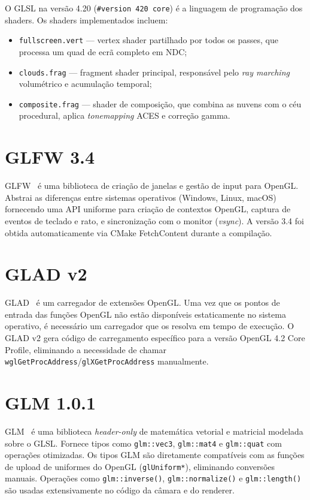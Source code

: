 O \ac{GLSL} na versão 4.20 (\texttt{\#version 420 core}) é a linguagem de programação dos shaders. Os shaders implementados incluem:

\begin{itemize}
    \item \texttt{fullscreen.vert} --- vertex shader partilhado por todos os passes, que processa um quad de ecrã completo em \ac{NDC};
    \item \texttt{clouds.frag} --- fragment shader principal, responsável pelo \emph{ray marching} volumétrico e acumulação temporal;
    \item \texttt{composite.frag} --- shader de composição, que combina as nuvens com o céu procedural, aplica \emph{tonemapping} ACES e correção gamma.
\end{itemize}

\section{GLFW 3.4}
\label{chap3:sec:glfw}

\ac{GLFW}~\cite{glfw} é uma biblioteca de criação de janelas e gestão de input para \ac{OpenGL}. Abstrai as diferenças entre sistemas operativos (Windows, Linux, macOS) fornecendo uma \ac{API} uniforme para criação de contextos OpenGL, captura de eventos de teclado e rato, e sincronização com o monitor (\emph{vsync}). A versão 3.4 foi obtida automaticamente via CMake FetchContent durante a compilação.

\section{GLAD v2}
\label{chap3:sec:glad}

\ac{GLAD}~\cite{glad} é um carregador de extensões \ac{OpenGL}. Uma vez que os pontos de entrada das funções OpenGL não estão disponíveis estaticamente no sistema operativo, é necessário um carregador que os resolva em tempo de execução. O GLAD v2 gera código de carregamento específico para a versão OpenGL 4.2 Core Profile, eliminando a necessidade de chamar \texttt{wglGetProcAddress}/\texttt{glXGetProcAddress} manualmente.

\section{GLM 1.0.1}
\label{chap3:sec:glm}

\ac{GLM}~\cite{glm} é uma biblioteca \emph{header-only} de matemática vetorial e matricial modelada sobre o \ac{GLSL}. Fornece tipos como \texttt{glm::vec3}, \texttt{glm::mat4} e \texttt{glm::quat} com operações otimizadas. Os tipos GLM são diretamente compatíveis com as funções de upload de uniformes do OpenGL (\texttt{glUniform*}), eliminando conversões manuais. Operações como \texttt{glm::inverse()}, \texttt{glm::normalize()} e \texttt{glm::length()} são usadas extensivamente no código da câmara e do renderer.

